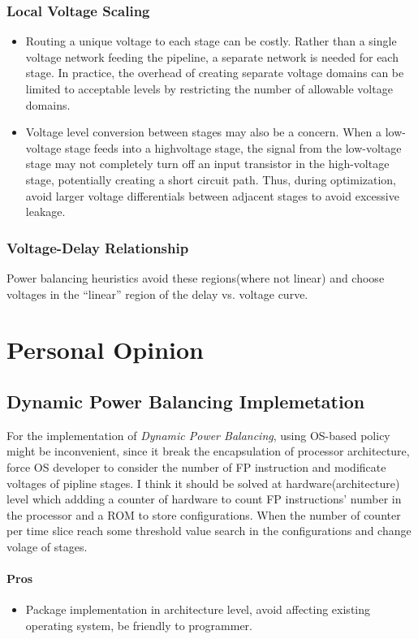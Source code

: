 \documentclass{article}
\begin{document}
\subsubsection{Local Voltage Scaling}
\begin{itemize}
    \item Routing a unique voltage to each stage can be costly. Rather
    than a single voltage network feeding the pipeline, a separate network is needed for each stage. In practice, the overhead of creating separate voltage domains can be limited to acceptable levels by restricting the number of allowable voltage domains.
    \item Voltage level conversion between stages may also be a concern. When a low-voltage stage feeds into a highvoltage stage, the signal from the low-voltage stage may not completely turn off an input transistor in the high-voltage
    stage, potentially creating a short circuit path. Thus, during optimization, avoid larger voltage differentials between adjacent stages to avoid excessive leakage.
\end{itemize}
\subsubsection{Voltage-Delay Relationship}
Power balancing heuristics avoid these regions(where not linear) and choose voltages in the “linear” region of the delay vs. voltage curve.
\section{Personal Opinion}
\subsection{Dynamic Power Balancing Implemetation}
For the implementation of \emph{Dynamic Power Balancing}, using OS-based policy might be inconvenient, since it break the encapsulation of processor architecture, force OS developer to consider the number of FP instruction and modificate voltages of pipline stages. I think it should be solved at hardware(architecture) level which addding a counter of hardware to count FP instructions' number in the processor and a ROM to store configurations. When the number of counter per time slice reach some threshold value search in the configurations and change volage of stages.
\paragraph{Pros}
\begin{itemize}
    \item Package implementation in architecture level, avoid affecting existing operating system, be friendly to programmer.
\end{itemize}
\end{document}
